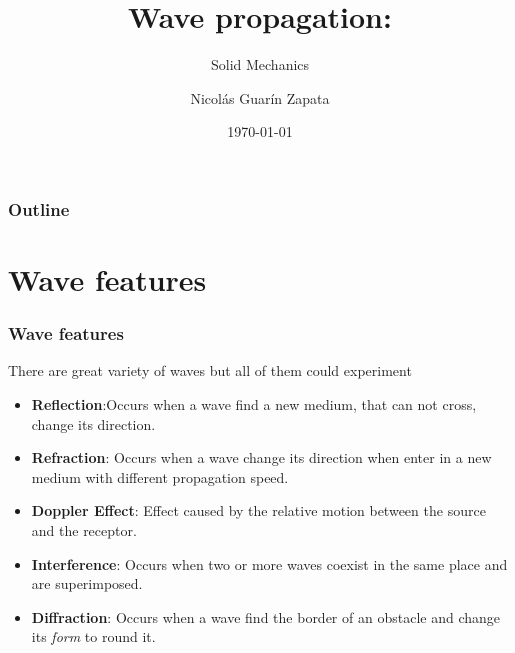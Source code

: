 \documentclass{beamer}
\begin{document}
\title[Wave propagation in solids] %
{Wave propagation:}
\subtitle{ Solid Mechanics}
\author[Guarin-Zapata, Nicolas] %
{Nicol\'as Guar\'in Zapata}
\date{\today}
\subject{Wave propagation}

\frame{\titlepage}

\begin{frame}
	\frametitle{Outline}
	\tableofcontents
\end{frame}
%

\section{Wave features}
\begin{frame}
	\frametitle{Wave features}
There are great variety of waves but all of them could experiment
\begin{itemize}
\item \textbf{Reflection}:Occurs when a wave find a new medium, that can not cross, change its direction.

\item \textbf{Refraction}: Occurs when a wave change its direction when enter in a new medium with different propagation speed.

\item \textbf{Doppler Effect}: Effect caused by the relative motion between the source and the receptor.

\item \textbf{Interference}: Occurs when two or more waves coexist in the same place and are superimposed.

\item \textbf{Diffraction}: Occurs when a wave find the border of an obstacle and change its \emph{form} to round it.
\end{itemize}

\end{frame}

\end{document}
